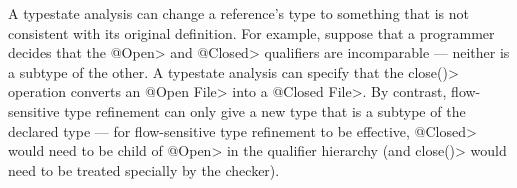 A typestate analysis can change a reference's type to something that is not
consistent with its original definition.  For example, suppose that a
programmer decides that the \<@Open> and \<@Closed> qualifiers are
incomparable --- neither is a subtype of the other.  A typestate analysis
can specify that the \<close()> operation converts an \<@Open File> into a
\<@Closed File>.  By contrast, flow-sensitive type refinement can only give
a new type that is a subtype of the declared type --- for flow-sensitive
type refinement to be effective, \<@Closed> would need to be child of
\<@Open> in the qualifier hierarchy (and \<close()> would need to be
treated specially by the checker).




